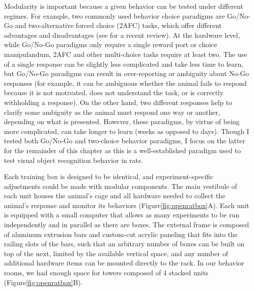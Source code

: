 Modularity is important because a given behavior can be tested under different regimes. For example, two commonly used behavior choice paradigms are Go/No-Go and two-alternative forced choice (2AFC) tasks, which offer different advantages and disadvantages (see \cite{Bjerre2020} for a recent review). At the hardware level, while Go/No-Go paradigms only require a single reward port or choice manipulandum, 2AFC and other multi-choice tasks require at least two. The use of a single response can be slightly less complicated and take less time to learn, but Go/No-Go paradigms can result in over-reporting or ambiguity about No-Go responses (for example, it can be ambiguous whether the animal fails to respond because it is not motivated, does not understand the task, or is correctly withholding a response)\cite{Andermann2010, Petreanu2012, Guo2014ProceduresMice}. On the other hand, two different responses help to clarify some ambiguity as the animal must respond one way or another, depending on what is presented\cite{OConnor2010, Zhong2019}. However, these paradigms, by virtue of being more complicated, can take longer to learn (weeks as opposed to days)\cite{Mayrhofer2013, Guo2014ProceduresMice}. Though I tested both Go/No-Go and two-choice behavior paradigms, I focus on the latter for the remainder of this chapter as this is a well-established paradigm used to test visual object recognition behavior in rats\cite{Lashley1930, Zoccolan2009, Prusky2000}.

Each training box is designed to be identical, and experiment-specific adjustments could be made with modular components. The main vestibule of each unit houses the animal's cage and all hardware needed to collect the animal's response and monitor its behaviors (Figure\ref{fig:openratbox}A). Each unit is equipped with a small computer that allows as many experiments to be run independently and in parallel as there are boxes. The external frame is composed of aluminum extrusion bars and custom-cut acrylic paneling that fits into the railing slots of the bars, such that an arbitrary number of boxes can be built on top of the next, limited by the available vertical space, and any number of additional hardware items can be mounted directly to the rack. In our behavior rooms, we had enough space for towers composed of 4 stacked units (Figure\ref{fig:openratbox}B). 


